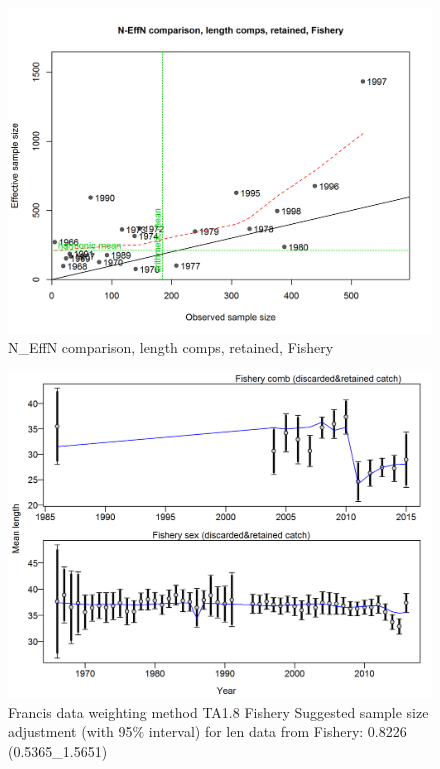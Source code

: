 \documentclass[12pt,]{article}
\begin{document}
\begin{figure}
\centering
\includegraphics{./r4ss/plots_mod1/comp_lenfit_sampsize_flt1mkt2.png}
\caption{N\_EffN comparison, length comps, retained, Fishery
\label{fig:mod1_8_comp_lenfit_sampsize_flt1mkt2}}
\end{figure}

\begin{figure}
\centering
\includegraphics{./r4ss/plots_mod1/comp_lenfit_data_weighting_TA1.8_Fishery.png}
\caption{Francis data weighting method TA1.8 Fishery Suggested sample
size adjustment (with 95\% interval) for len data from Fishery: 0.8226
(0.5365\_1.5651)
\label{fig:mod1_9_comp_lenfit_data_weighting_TA1.8_Fishery}}
\end{figure}
\end{document}
